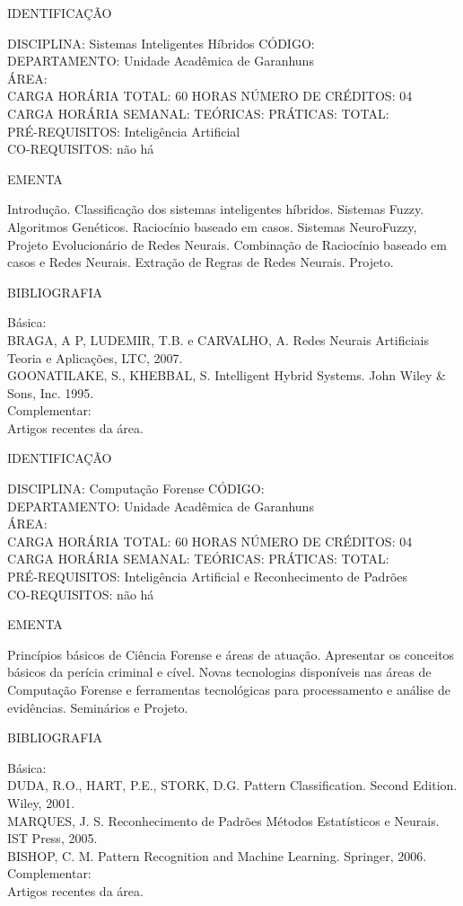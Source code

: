 \documentclass[
	12pt,				%
	openright,			%
  oneside,     %
	a4paper,			%
	english,			%
	french,				%
	spanish,			%
	brazil				%
	]{abntex2}
\begin{document}
\begin{apendicesenv}
\newpage IDENTIFICAÇÃO

DISCIPLINA: Sistemas Inteligentes Híbridos CÓDIGO:\\ 
DEPARTAMENTO: Unidade Acadêmica de Garanhuns\\
ÁREA: \\
CARGA HORÁRIA TOTAL: 60 HORAS NÚMERO DE CRÉDITOS: 04\\
CARGA HORÁRIA SEMANAL: TEÓRICAS: PRÁTICAS: TOTAL: \\
PRÉ-REQUISITOS: Inteligência Artificial\\
CO-REQUISITOS: não há

EMENTA 

Introdução. Classificação dos sistemas inteligentes
híbridos. Sistemas Fuzzy. Algoritmos Genéticos. Raciocínio baseado em
casos. Sistemas NeuroFuzzy, Projeto Evolucionário de Redes Neurais.
Combinação de Raciocínio baseado em casos e Redes Neurais. Extração de
Regras de Redes Neurais. Projeto.

BIBLIOGRAFIA 

Básica:\\
BRAGA, A P, LUDEMIR, T.B. e CARVALHO, A. Redes Neurais Artificiais 
Teoria e Aplicações, LTC, 2007.\\
GOONATILAKE, S., KHEBBAL, S.  Intelligent Hybrid Systems. John Wiley
\& Sons, Inc. 1995.\\
Complementar:\\
Artigos recentes da área.

\newpage IDENTIFICAÇÃO

DISCIPLINA: Computação Forense CÓDIGO:\\ 
DEPARTAMENTO: Unidade Acadêmica de Garanhuns\\
ÁREA: \\
CARGA HORÁRIA TOTAL: 60 HORAS NÚMERO DE CRÉDITOS: 04\\
CARGA HORÁRIA SEMANAL: TEÓRICAS: PRÁTICAS: TOTAL: \\
PRÉ-REQUISITOS: Inteligência Artificial e Reconhecimento de Padrões\\
CO-REQUISITOS: não há

EMENTA 

Princípios básicos de Ciência Forense e áreas de atuação. Apresentar os
conceitos básicos da perícia criminal e cível. Novas tecnologias
disponíveis nas áreas de Computação Forense e ferramentas tecnológicas
para processamento e análise de evidências. Seminários e Projeto.

BIBLIOGRAFIA 

Básica:\\
DUDA, R.O., HART, P.E., STORK, D.G. Pattern Classification. Second
Edition. Wiley, 2001.\\MARQUES, J. S. Reconhecimento de Padrões  Métodos Estatísticos e
Neurais. IST Press, 2005.\\BISHOP, C. M. Pattern Recognition and Machine Learning. Springer, 2006.\\
Complementar:\\
Artigos recentes da área.


\end{apendicesenv}
\end{document}
